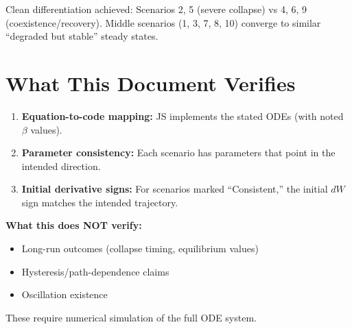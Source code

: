 \documentclass[11pt]{article}
\begin{document}
Clean differentiation achieved: Scenarios 2, 5 (severe collapse) vs 4, 6, 9 (coexistence/recovery). Middle scenarios (1, 3, 7, 8, 10) converge to similar ``degraded but stable'' steady states.

\section{What This Document Verifies}

\begin{enumerate}
    \item \textbf{Equation-to-code mapping:} JS implements the stated ODEs (with noted $\beta$ values).
    \item \textbf{Parameter consistency:} Each scenario has parameters that point in the intended direction.
    \item \textbf{Initial derivative signs:} For scenarios marked ``Consistent,'' the initial $dW$ sign matches the intended trajectory.
\end{enumerate}

\textbf{What this does NOT verify:}
\begin{itemize}
    \item Long-run outcomes (collapse timing, equilibrium values)
    \item Hysteresis/path-dependence claims
    \item Oscillation existence
\end{itemize}

These require numerical simulation of the full ODE system.
\end{document}
